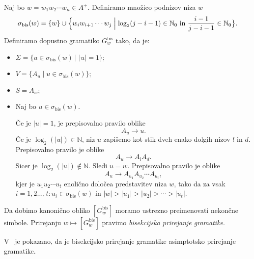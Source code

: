 \documentclass[fin1, tisk]{fmfdelo}
\providecommand{\abs}[1]{\left\lvert #1 \right\rvert}
\newcommand{\N}{\mathbb{N}}
\theoremstyle{definition}
\begin{document}
\begin{definicija}
    Naj bo $w = w_1w_2 \cdots w_n \in A^+$. Definiramo množico podnizov niza $w$ 
    \[
        \sigma_{\text{bis}}(w) = \{ w \} \cup \Bigl\{ w_iw_{i+1} \cdots w_j \Bigm| \log_2(j-i-1) \in \N_0
        \text{ in } \frac{i-1}{j-i-1} \in \N_0 \bigr\}.
    \]
    Definiramo dopustno gramatiko $G^\text{bis}_w$ tako, da je:
    \begin{itemize}
        \item $\Sigma = \{ u \in \sigma_{\text{bis}}(w) \mid \abs{u} = 1 \}$;
        \item $V = \{ A_u \mid u \in \sigma_{\text{bis}}(w) \}$;
        \item $S = A_w$;
        \item Naj bo $u \in \sigma_{\text{bis}}(w)$. 
        
        Če je $\abs{u} = 1$, je prepisovalno pravilo oblike
        \[
            A_u \rightarrow u.
        \]
        Če je $\log_2(\abs{u}) \in \N$, niz $u$ zapišemo kot stik dveh enako dolgih nizov $l$ in 
        $d$. Prepisovalno pravilo je oblike
        \[
            A_u \rightarrow A_lA_d.
        \]
        Sicer je $\log_2(\abs{u}) \notin \N$. Sledi $u=w$. Prepisovalno pravilo je oblike
        \[
            A_u \rightarrow A_{u_1}A_{u_2} \cdots A_{u_t},
        \]
        kjer je $u_1u_2 \cdots u_t$ enolično določea predstavitev niza $w$, tako da za vsak
        $i= 1, 2 \ldots, t \colon u_i \in \sigma_{\text{bis}}(w)$ in 
        $\abs{w} > \abs{u_1} > \abs{u_2} > \cdots > \abs{u_t}$.
    \end{itemize}
    Da dobimo kanonično obliko $[G^\text{bis}_w]$ moramo ustrezno preimenovati nekončne simbole.
    Prirejanju $w \mapsto [G^\text{bis}_w]$ pravimo \emph{bisekcijsko prirejanje gramatike}.
\end{definicija}

V~\cite{KiefferYangEt2000} je pokazano, da je bisekcijsko prirejanje gramatike asimptotsko 
prirejanje gramatike.
\end{document}
